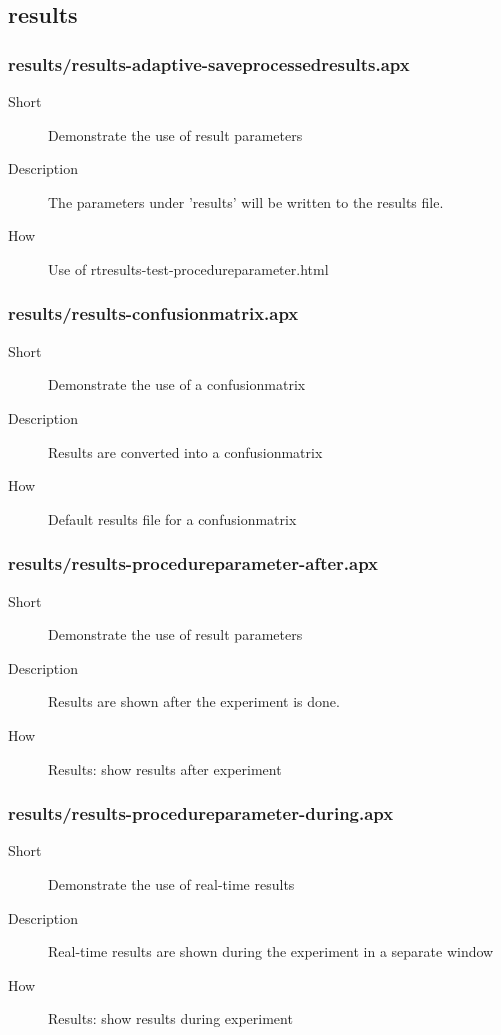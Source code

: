 \subsection{results}
\subsubsection{results/results-adaptive-saveprocessedresults.apx}
\begin{description}
\item[Short] 
 Demonstrate the use of result parameters
\item[Description] 
 The parameters under 'results' will be written to the results file.
\item[How] 
 Use of rtresults-test-procedureparameter.html
\end{description}

\subsubsection{results/results-confusionmatrix.apx}
\begin{description}
\item[Short] 
 Demonstrate the use of a confusionmatrix
\item[Description] 
 Results are converted into a confusionmatrix
\item[How] 
 Default results file for a confusionmatrix
\end{description}

\subsubsection{results/results-procedureparameter-after.apx}
\begin{description}
\item[Short] 
 Demonstrate the use of result parameters
\item[Description] 
 Results are shown after the experiment is done.
\item[How] 
 Results: show results after experiment
\end{description}

\subsubsection{results/results-procedureparameter-during.apx}
\begin{description}
\item[Short] 
 Demonstrate the use of real-time results
\item[Description] 
 Real-time results are shown during the experiment in a separate window
\item[How] 
 Results: show results during experiment
\end{description}

